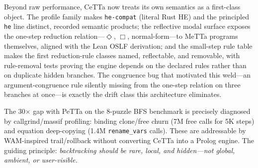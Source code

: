 \documentclass[11pt]{article}
\newcommand{\code}[1]{\texttt{#1}}
\newcommand{\PeTTa}{\textup{PeTTa}}
\newcommand{\HE}{\textup{HE}}
\newcommand{\CeTTa}{\textup{CeTTa}}
\begin{document}
Beyond raw performance, \CeTTa{} now treats its own semantics as a
first-class object.  The profile family makes \code{he-compat} (literal
Rust \HE{}) and the principled \code{he} line distinct, recorded
semantic products; the reflective modal surface exposes the one-step
reduction relation---$\Diamond$, $\Box$, normal-form---to MeTTa
programs themselves, aligned with the Lean OSLF derivation; and the
small-step rule table makes the first reduction-rule classes named,
reflectable, and removable, with rule-removal tests proving the engine
depends on the declared rules rather than on duplicate hidden branches.
The congruence bug that motivated this weld---an argument-congruence
rule silently missing from the one-step relation on three branches at
once---is exactly the drift class this architecture eliminates.

The 30$\times$ gap with \PeTTa{} on the 8-puzzle BFS benchmark
is precisely diagnosed by callgrind/massif profiling: binding
clone/free churn (7M free calls for 5K steps) and equation
deep-copying (1.4M \code{rename\_vars} calls).  These are
addressable by WAM-inspired trail/rollback without converting
\CeTTa{} into a Prolog engine.  The guiding principle:
\emph{backtracking should be rare, local, and hidden---not global,
ambient, or user-visible.}
\end{document}
